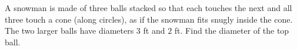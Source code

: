 A snowman is made of three balls stacked so that each touches the next and all three touch a cone (along circles), as if the snowman fits snugly inside the cone. The two larger balls have diameters $3$ ft and $2$ ft. Find the diameter of the top ball.
